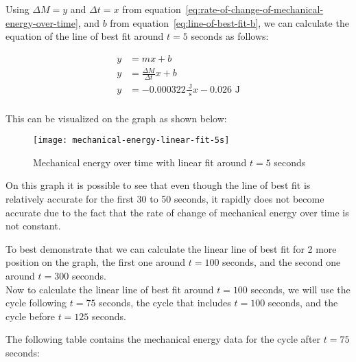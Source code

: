 \documentclass{article}
\begin{document}
            Using $\Delta M = y$ and $\Delta t = x$ from equation~\ref{eq:rate-of-change-of-mechanical-energy-over-time}, and $b$ from equation~\ref{eq:line-of-best-fit-b}, we can calculate the equation of the line of best fit around $t=5$ seconds as follows:
            
            \begin{equation}
                \begin{aligned}
                    y &= mx + b \\
                    y &= \frac{\Delta M}{\Delta t}x + b \\
                    y &= -0.000322 \frac{\text{ J}}{\text{ s}}x - 0.026 \text{ J} \\
                \end{aligned}\label{eq:line-of-best-fit-equation-around-5-seconds}
            \end{equation}
            
            This can be visualized on the graph as shown below:
            
            \begin{figure}[H]
                \centering
                \texttt{[image: mechanical-energy-linear-fit-5s]}
                \caption{Mechanical energy over time with linear fit around $t=5$ seconds}
                \label{fig:mechanical-energy-linear-fit-5s}
            \end{figure}
            
            On this graph it is possible to see that even though the line of best fit is relatively accurate for the first 30 to 50 seconds, it rapidly does not become accurate due to the fact that the rate of change of mechanical energy over time is not constant.
            
            To best demonstrate that we can calculate the linear line of best fit for 2 more position on the graph, the first one around $t=100$ seconds, and the second one around $t=300$ seconds.\\
            \newline \indent Now to calculate the linear line of best fit around $t=100$ seconds, we will use the cycle following $t=75$ seconds, the cycle that includes $t=100$ seconds, and the cycle before $t=125$ seconds.
            
            The following table contains the mechanical energy data for the cycle after $t=75$ seconds:
            
\end{document}
